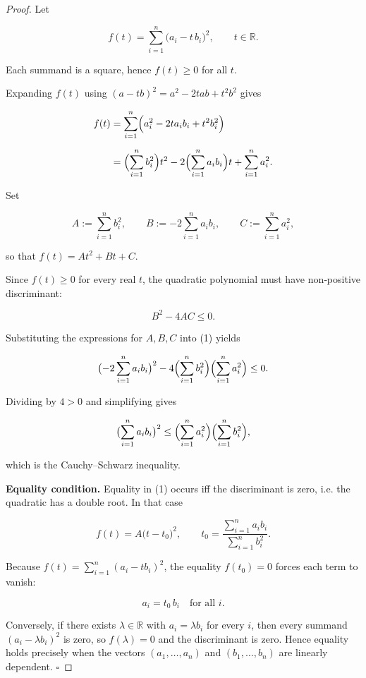 \begin{proof}
Let  

\[
f(t)=\sum_{i=1}^{n}\bigl(a_i-t\,b_i\bigr)^{2},\qquad t\in\mathbb{R}.
\]

Each summand is a square, hence \(f(t)\ge0\) for all \(t\).  

Expanding \(f(t)\) using \((a-tb)^{2}=a^{2}-2tab+t^{2}b^{2}\) gives  

\[
\begin{aligned}
f(t)
&=\sum_{i=1}^{n}\Bigl(a_i^{2}-2t a_i b_i+t^{2}b_i^{2}\Bigr)\\[2mm]
&=\Bigl(\sum_{i=1}^{n}b_i^{2}\Bigr)t^{2}
   -2\Bigl(\sum_{i=1}^{n}a_i b_i\Bigr)t
   +\sum_{i=1}^{n}a_i^{2}.
\end{aligned}
\]

Set  

\[
A:=\sum_{i=1}^{n}b_i^{2},\qquad 
B:=-2\sum_{i=1}^{n}a_i b_i,\qquad 
C:=\sum_{i=1}^{n}a_i^{2},
\]

so that \(f(t)=At^{2}+Bt+C\).

Since \(f(t)\ge0\) for every real \(t\), the quadratic polynomial must have non‑positive discriminant:

\[
B^{2}-4AC\le0. \tag{1}
\]

Substituting the expressions for \(A,B,C\) into (1) yields  

\[
\bigl(-2\sum_{i=1}^{n}a_i b_i\bigr)^{2}
-4\Bigl(\sum_{i=1}^{n}b_i^{2}\Bigr)\Bigl(\sum_{i=1}^{n}a_i^{2}\Bigr)\le0.
\]

Dividing by \(4>0\) and simplifying gives  

\[
\bigl(\sum_{i=1}^{n}a_i b_i\bigr)^{2}
\le
\Bigl(\sum_{i=1}^{n}a_i^{2}\Bigr)
\Bigl(\sum_{i=1}^{n}b_i^{2}\Bigr),
\]

which is the Cauchy–Schwarz inequality.

\medskip
\noindent\textbf{Equality condition.}  
Equality in (1) occurs iff the discriminant is zero, i.e. the quadratic has a double root. In that case  

\[
f(t)=A\bigl(t-t_{0}\bigr)^{2},\qquad 
t_{0}=\frac{\sum_{i=1}^{n}a_i b_i}{\sum_{i=1}^{n}b_i^{2}}.
\]

Because \(f(t)=\sum_{i=1}^{n}(a_i-t b_i)^{2}\), the equality \(f(t_{0})=0\) forces each term to vanish:

\[
a_i=t_{0}\,b_i\quad\text{for all }i.
\]

Conversely, if there exists \(\lambda\in\mathbb{R}\) with \(a_i=\lambda b_i\) for every \(i\), then every summand \((a_i-\lambda b_i)^{2}\) is zero, so \(f(\lambda)=0\) and the discriminant is zero. Hence equality holds precisely when the vectors \((a_{1},\dots ,a_{n})\) and \((b_{1},\dots ,b_{n})\) are linearly dependent. \(\square\)
\end{proof}